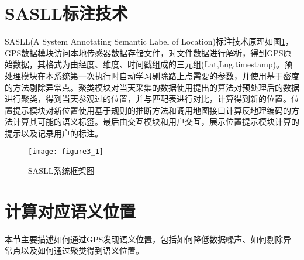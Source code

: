 \section{SASLL标注技术}
\label{sec:section3-1}
SASLL(A System Annotating Semantic Label of Location)标注技术原理如图\ref{fig:3_1}，GPS数据模块访问本地传感器数据存储文件，对文件数据进行解析，得到GPS原始数据，其格式为由经度、维度、时间戳组成的三元组(Lat,Lng,timestamp)。预处理模块在本系统第一次执行时自动学习剔除路上点需要的参数，并使用基于密度的方法剔除异常点。聚类模块对当天采集的数据使用提出的算法对预处理后的数据进行聚类，得到当天参观过的位置，并与匹配表进行对比，计算得到新的位置。位置提示模块对新位置使用基于规则的推断方法和调用地图接口计算反地理编码的方法计算其可能的语义标签。最后由交互模块和用户交互，展示位置提示模块计算的提示以及记录用户的标注。
\begin{figure}[htp]
\centering
\texttt{[image: figure3\_1]}
\caption{SASLL系统框架图}
\label{fig:3_1}
\end{figure}
\section{计算对应语义位置}
\label{sec:section3-2}
本节主要描述如何通过GPS发现语义位置，包括如何降低数据噪声、如何剔除异常点以及如何通过聚类得到语义位置。
